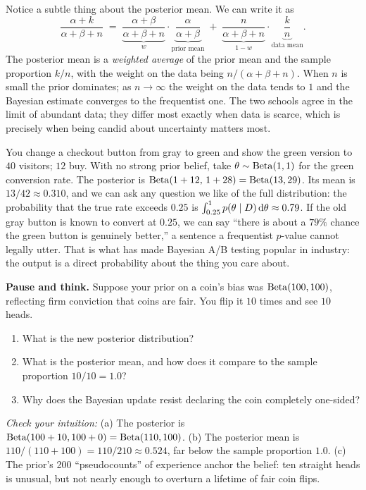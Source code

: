 \begin{walkbox}
Notice a subtle thing about the posterior mean. We can write it as
\[
  \frac{\alpha + k}{\alpha + \beta + n}
  \;=\; \underbrace{\frac{\alpha+\beta}{\alpha+\beta+n}}_{w}\cdot
        \underbrace{\frac{\alpha}{\alpha+\beta}}_{\text{prior mean}}
   \;+\; \underbrace{\frac{n}{\alpha+\beta+n}}_{1-w}\cdot
        \underbrace{\frac{k}{n}}_{\text{data mean}}.
\]
The posterior mean is a \emph{weighted average} of the prior mean and the sample
proportion $k/n$, with the weight on the data being $n/(\alpha+\beta+n)$. When $n$ is small
the prior dominates; as $n\to\infty$ the weight on the data tends to $1$ and the Bayesian
estimate converges to the frequentist one. The two schools agree in the limit of abundant
data; they differ most exactly when data is scarce, which is precisely when being candid about
uncertainty matters most.
\end{walkbox}

\begin{example}
\label{ch31:ex-ab}
You change a checkout button from gray to green and show the green version to $40$ visitors;
$12$ buy. With no strong prior belief, take $\theta\sim\operatorname{Beta}(1,1)$ for the green
conversion rate. The posterior is $\operatorname{Beta}(1+12,\,1+28) = \operatorname{Beta}(13,29)$. Its mean is
$13/42 \approx 0.310$, and we can ask any question we like of the full distribution: the
probability that the true rate exceeds $0.25$ is $\int_{0.25}^{1} p(\theta\mid D)\,
\mathrm{d}\theta \approx 0.79$. If the old gray button is known to convert at $0.25$, we can say
``there is about a $79\%$ chance the green button is genuinely better,'' a sentence a
frequentist $p$-value cannot legally utter. That is what has made Bayesian A/B testing
popular in industry: the output is a direct probability about the thing you care about.
\end{example}

\begin{recoverybox}
\textbf{Pause and think.} Suppose your prior on a coin's bias was $\operatorname{Beta}(100, 100)$, reflecting firm conviction that coins are fair. You flip it $10$ times and see $10$ heads.
\begin{enumerate}[label=(\alph*)]
  \item What is the new posterior distribution?
  \item What is the posterior mean, and how does it compare to the sample proportion $10/10 = 1.0$?
  \item Why does the Bayesian update resist declaring the coin completely one-sided?
\end{enumerate}
\textit{Check your intuition:}
(a) The posterior is $\operatorname{Beta}(100+10, 100+0) = \operatorname{Beta}(110, 100)$.
(b) The posterior mean is $110/(110+100) = 110/210 \approx 0.524$, far below the sample proportion $1.0$.
(c) The prior's 200 ``pseudocounts'' of experience anchor the belief: ten straight heads is unusual, but not nearly enough to overturn a lifetime of fair coin flips.
\end{recoverybox}

